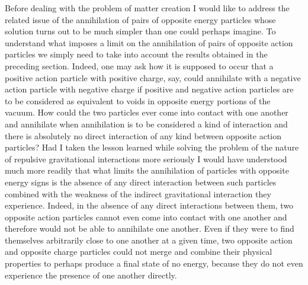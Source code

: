 \documentclass[notitlepage,12pt]{report}
\begin{document}
Before dealing with the problem of matter creation I would like to address the related issue of the annihilation of pairs of opposite energy particles whose solution turns out to be much simpler than one could perhaps imagine. To understand what imposes a limit on the annihilation of pairs of opposite action particles we simply need to take into account the results obtained in the preceding section. Indeed, one may ask how it is supposed to occur that a positive action particle with positive charge, say, could annihilate with a negative action particle with negative charge if positive and negative action particles are to be considered as equivalent to voids in opposite energy portions of the vacuum. How could the two particles ever come into contact with one another and annihilate when annihilation is to be considered a kind of interaction and there is absolutely no direct interaction of any kind between opposite action particles? Had I taken the lesson learned while solving the problem of the nature of repulsive gravitational interactions more seriously I would have understood much more readily that what limits the annihilation of particles with opposite energy signs is the absence of any direct interaction between such particles combined with the weakness of the indirect gravitational interaction they experience. Indeed, in the absence of any direct interactions between them, two opposite action particles cannot even come into contact with one another and therefore would not be able to annihilate one another. Even if they were to find themselves arbitrarily close to one another at a given time, two opposite action and opposite charge particles could not merge and combine their physical properties to perhaps produce a final state of no energy, because they do not even experience the presence of one another directly.
\end{document}
